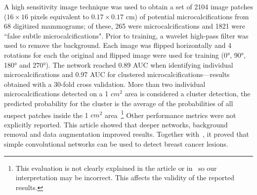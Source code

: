 A high sensitivity image technique was used to obtain a set of 2104 image patches ($16 \times 16$ pixels equivalent to $0.17 \times 0.17$ cm) of potential microcalcifications from 68 digitized mammograms; of these, 265 were microcalcifications and 1821 were ``false subtle microcalcifications". Prior to training, a wavelet high-pass filter was used to remove the background. Each image was flipped horizontally and 4 rotations for each the original and flipped image were used for training (0°, 90°, 180° and 270°).
The network reached 0.89 AUC when identifying individual microcalcifications and 0.97 AUC for clustered microcalcifications---results obtained with a 30-fold cross validation. More than two individual microcalcifications detected on a 1 $cm^2$ area is considered a cluster detection, the predicted probability for the cluster is the average of the probabilities of all suspect patches inside the 1 $cm^2$ area~\footnote{This evaluation is not clearly explained in the article or in~\cite{Lo1998} so our interpretation may be incorrect. This affects the validity of the reported results.} Other performance metrics were not explicitly reported.
This article showed that deeper networks, background removal and data augmentation improved results. Together with~\cite{Sahiner1996}, it proved that simple convolutional networks can be used to detect breast cancer lesions.



